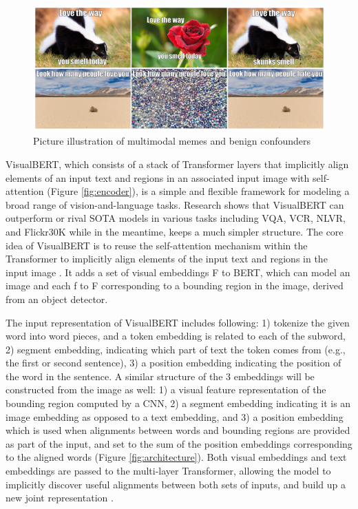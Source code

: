 \documentclass[10pt,twocolumn,letterpaper]{article}
\begin{document}
\graphicspath{ {./images/} }

\begin{figure}
\begin{center}
\includegraphics[scale = 1]{Figure1}
\end{center}
   \caption{Picture illustration of multimodal memes and benign confounders \cite{g_kiela2021hateful}}
\label{fig:illustration}
\end{figure}

VisualBERT, which consists of a stack of Transformer layers that implicitly align elements of an input text and regions in an associated input image with self-attention (Figure \ref{fig:encoder}), is a simple and flexible framework for modeling a broad range of vision-and-language tasks. Research shows that VisualBERT can outperform or rival SOTA models in various tasks including VQA, VCR, NLVR, and Flickr30K while in the meantime, keeps a much simpler structure. The core idea of VisualBERT is to reuse the self-attention mechanism within the Transformer to implicitly align elements of the input text and regions in the input image \cite{b_li2019visualbert}\cite{a_vaswani2017attention}. It adds a set of visual embeddings F to BERT, which can model an image and each f to F corresponding to a bounding region in the image, derived from an object detector. 

The input representation of VisualBERT includes following: 1) tokenize the given word into word pieces, and a token embedding is related to each of the subword, 2) segment embedding, indicating which part of text the token comes from (e.g., the first or second sentence), 3) a position embedding indicating the position of the word in the sentence. A similar structure of the 3 embeddings will be constructed from the image as well: 1)  a visual feature representation of the bounding region computed by a CNN, 2) a segment embedding indicating it is an image embedding as opposed to a text embedding, and 3) a position embedding  which is used when alignments between words and bounding regions are provided as part of the input, and set to the sum of the position embeddings corresponding to the aligned words (Figure \ref{fig:architecture}). Both visual embeddings and text embeddings are passed to the multi-layer Transformer,  allowing the model to implicitly discover useful alignments between both sets of inputs, and build up a new joint representation \cite{b_li2019visualbert}.
\end{document}
